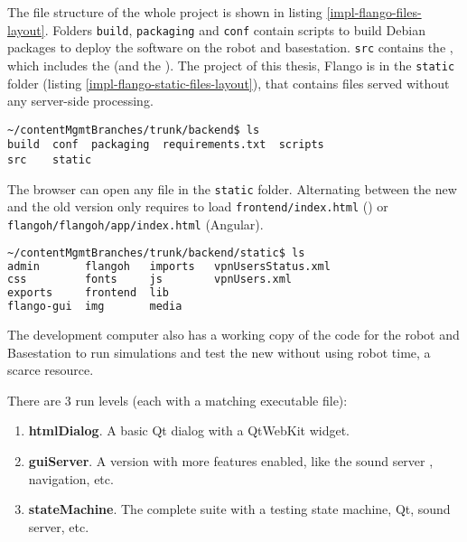 The file structure of the whole project is shown in listing \ref{impl-flango-files-layout}.
Folders \texttt{build}, \texttt{packaging} and \texttt{conf} contain scripts to build Debian packages to deploy the software on the robot and basestation.
\texttt{src} contains the \flangobe , which includes the \flangofe (and the \se).
The project of this thesis, Flango \cm is in the \texttt{static} folder (listing \ref{impl-flango-static-files-layout}), that contains files served without any server-side processing.

\begin{lstlisting}[columns=fixed,caption=Flango files layout, label=impl-flango-files-layout]
~/contentMgmtBranches/trunk/backend$ ls
build  conf  packaging  requirements.txt  scripts
src    static
\end{lstlisting}

The browser can open any file in the \texttt{static} folder.
Alternating between the new and the old version only requires to load \texttt{frontend/index.html} (\flash) or \\ \texttt{flangoh/flangoh/app/index.html} (Angular).

\begin{lstlisting}[columns=fixed,language=bash,caption=Flango static files layout, label=impl-flango-static-files-layout]
~/contentMgmtBranches/trunk/backend/static$ ls
admin       flangoh   imports   vpnUsersStatus.xml
css         fonts     js        vpnUsers.xml
exports     frontend  lib
flango-gui  img       media
\end{lstlisting}

The development computer also has a working copy of the code for the robot and Basestation to run simulations and test the new \cm  without using robot time, a scarce resource.

There are 3 run levels (each with a matching executable file):
\begin{enumerate}
\item \textbf{htmlDialog}. A basic Qt dialog with a QtWebKit widget.
\item \textbf{guiServer}. A version with more features enabled, like the sound server , navigation, etc.
\item \textbf{stateMachine}. The complete suite with a testing state machine, Qt, sound server, etc.
\end{enumerate}

